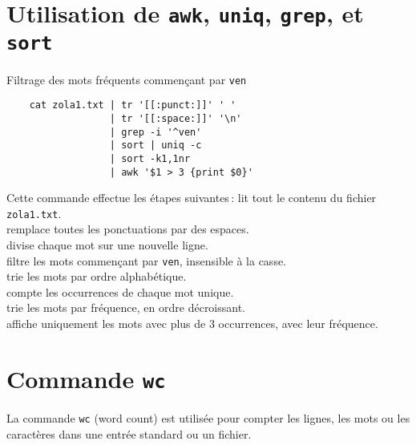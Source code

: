 \documentclass[a4paper]{report}
\begin{document}
    \section{Utilisation de \texttt{awk}, \texttt{uniq}, \texttt{grep}, et \texttt{sort}}
    \begin{EExample}{Filtrage des mots fréquents commençant par \texttt{ven}}{}
        \begin{verbatim}
    cat zola1.txt | tr '[[:punct:]]' ' ' 
                  | tr '[[:space:]]' '\n' 
                  | grep -i '^ven' 
                  | sort | uniq -c 
                  | sort -k1,1nr 
                  | awk '$1 > 3 {print $0}'
        \end{verbatim}
        Cette commande effectue les étapes suivantes :
        lit tout le contenu du fichier \texttt{zola1.txt}. \\
        remplace toutes les ponctuations par des espaces. \\
        divise chaque mot sur une nouvelle ligne. \\
        filtre les mots commençant par \texttt{ven}, insensible à la casse. \\
        trie les mots par ordre alphabétique. \\
        compte les occurrences de chaque mot unique. \\
        \noindent{} 
        trie les mots par fréquence, en ordre décroissant. \\
        \noindent{} 
        affiche uniquement les mots avec plus de 3 occurrences, avec leur fréquence.
    \end{EExample}

    \section{Commande \texttt{wc}}
    \begin{Définition}
        La commande \texttt{wc} (word count) est utilisée pour compter les lignes, 
        les mots ou les caractères dans une entrée standard ou un fichier.
    \end{Définition}
\end{document}
